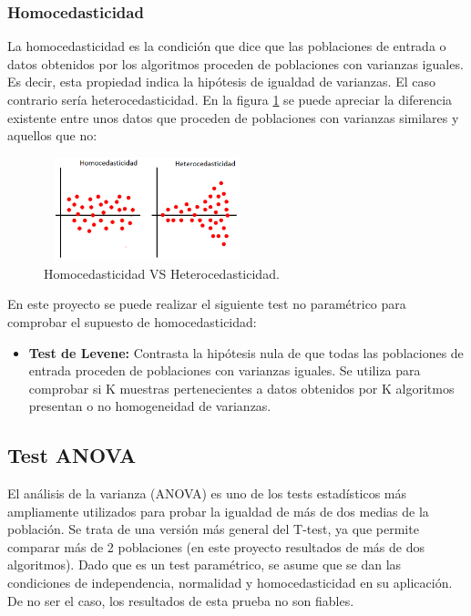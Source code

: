 \subsubsection{Homocedasticidad}
La homocedasticidad es la condición que dice que las poblaciones de entrada o datos obtenidos por los algoritmos
proceden de poblaciones con varianzas iguales. Es decir, esta propiedad indica la hipótesis de igualdad de
varianzas. El caso contrario sería heterocedasticidad. En la figura \ref{fig:homocedasticidad} se puede apreciar
la diferencia existente entre unos datos que proceden de poblaciones con varianzas similares y aquellos que
no:

\begin{figure}[h]
\centering
\includegraphics[width=6cm,height=3cm]{figuras/homocedasticidad.png}
\caption{Homocedasticidad VS Heterocedasticidad.}
\label{fig:homocedasticidad}
\end{figure} 

En este proyecto se puede realizar el siguiente test no paramétrico para comprobar el supuesto de homocedasticidad:

\begin{itemize}
\item \textbf{Test de Levene:} Contrasta la hipótesis nula de que todas las poblaciones de entrada proceden de
poblaciones con varianzas iguales. Se utiliza para comprobar si K muestras pertenecientes a datos obtenidos por
K algoritmos presentan o no homogeneidad de varianzas. 
\end{itemize}


\subsection{Test ANOVA}
El análisis de la varianza (ANOVA) es uno de los tests estadísticos más ampliamente utilizados para probar
la igualdad de más de dos medias de la población. Se trata de una versión más general del T-test, ya que permite
comparar más de 2 poblaciones (en este proyecto resultados de más de dos algoritmos). Dado que es un test
paramétrico, se asume que se dan las condiciones de independencia, normalidad y homocedasticidad en su
aplicación. De no ser el caso, los resultados de esta prueba no son fiables.

